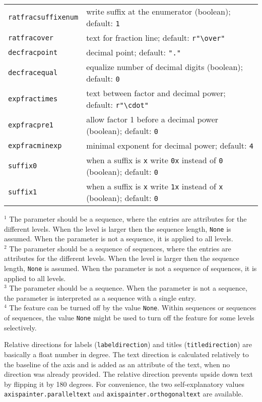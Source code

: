 \begin{tabularx}{\linewidth}{l>{\raggedright\arraybackslash}X}
\texttt{ratfracsuffixenum}&write suffix at the enumerator (boolean); default: \texttt{1}\\
\texttt{ratfracover}&text for fraction line; default: \texttt{r"\textbackslash over"}\\
\texttt{decfracpoint}&decimal point; default: \texttt{"."}\\
\texttt{decfracequal}&equalize number of decimal digits (boolean); default: \texttt{0}\\
\texttt{expfractimes}&text between factor and decimal power; default: \texttt{r"\textbackslash cdot"}\\
\texttt{expfracpre1}&allow factor 1 before a decimal power (boolean); default: \texttt{0}\\
\texttt{expfracminexp}&minimal exponent for decimal power; default: \texttt{4}\\
\texttt{suffix0}&when a suffix is \texttt{x} write \texttt{0x} instead of \texttt{0} (boolean); default: \texttt{0}\\
\texttt{suffix1}&when a suffix is \texttt{x} write \texttt{1x} instead of \texttt{x} (boolean); default: \texttt{0}\\
\end{tabularx}
\medskip

$^1$
The parameter should be a sequence, where the entries are attributes
for the different levels. When the level is larger then the sequence
length, \verb|None| is assumed. When the parameter is not a sequence,
it is applied to all levels.\\
$^2$
The parameter should be a sequence of sequences, where the entries are
attributes for the different levels. When the level is larger then the
sequence length, \verb|None| is assumed. When the parameter is not a
sequence of sequences, it is applied to all levels.\\
$^3$
The parameter should be a sequence. When the parameter is not a
sequence, the parameter is interpreted as a sequence with a single
entry.\\
$^4$
The feature can be turned off by the value \verb|None|. Within
sequences or sequences of sequences, the value \verb|None| might be
used to turn off the feature for some levels selectively.
\medskip

Relative directions for labels (\verb|labeldirection|) and titles
(\verb|titledirection|) are basically a float number in degree. The
text direction is calculated relatively to the baseline of the axis
and is added as an attribute of the text, when no direction was
already provided. The relative direction prevents upside down text by
flipping it by 180 degrees. For convenience, the two self-explanatory
values \verb|axispainter.paralleltext| and
\verb|axispainter.orthogonaltext| are available.

